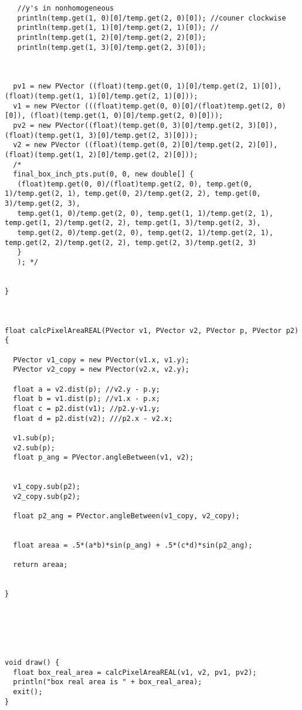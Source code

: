 \documentclass[11pt, twoside, reqno]{book}
\begin{document}
\begin{Verbatim}
   //y's in nonhomogeneous
   println(temp.get(1, 0)[0]/temp.get(2, 0)[0]); //couner clockwise 
   println(temp.get(1, 1)[0]/temp.get(2, 1)[0]); //
   println(temp.get(1, 2)[0]/temp.get(2, 2)[0]);
   println(temp.get(1, 3)[0]/temp.get(2, 3)[0]);
   
  

  pv1 = new PVector ((float)(temp.get(0, 1)[0]/temp.get(2, 1)[0]), (float)(temp.get(1, 1)[0]/temp.get(2, 1)[0]));
  v1 = new PVector (((float)temp.get(0, 0)[0]/(float)temp.get(2, 0)[0]), (float)(temp.get(1, 0)[0]/temp.get(2, 0)[0]));
  pv2 = new PVector((float)(temp.get(0, 3)[0]/temp.get(2, 3)[0]), (float)(temp.get(1, 3)[0]/temp.get(2, 3)[0]));
  v2 = new PVector ((float)(temp.get(0, 2)[0]/temp.get(2, 2)[0]), (float)(temp.get(1, 2)[0]/temp.get(2, 2)[0]));
  /*
  final_box_inch_pts.put(0, 0, new double[] { 
   (float)temp.get(0, 0)/(float)temp.get(2, 0), temp.get(0, 1)/temp.get(2, 1), temp.get(0, 2)/temp.get(2, 2), temp.get(0, 3)/temp.get(2, 3), 
   temp.get(1, 0)/temp.get(2, 0), temp.get(1, 1)/temp.get(2, 1), temp.get(1, 2)/temp.get(2, 2), temp.get(1, 3)/temp.get(2, 3), 
   temp.get(2, 0)/temp.get(2, 0), temp.get(2, 1)/temp.get(2, 1), temp.get(2, 2)/temp.get(2, 2), temp.get(2, 3)/temp.get(2, 3)
   }
   ); */


}



float calcPixelAreaREAL(PVector v1, PVector v2, PVector p, PVector p2) {

  PVector v1_copy = new PVector(v1.x, v1.y);
  PVector v2_copy = new PVector(v2.x, v2.y); 

  float a = v2.dist(p); //v2.y - p.y;
  float b = v1.dist(p); //v1.x - p.x;
  float c = p2.dist(v1); //p2.y-v1.y;
  float d = p2.dist(v2); ///p2.x - v2.x;

  v1.sub(p);
  v2.sub(p);
  float p_ang = PVector.angleBetween(v1, v2);
  

  v1_copy.sub(p2); 
  v2_copy.sub(p2);

  float p2_ang = PVector.angleBetween(v1_copy, v2_copy);


  float areaa = .5*(a*b)*sin(p_ang) + .5*(c*d)*sin(p2_ang);

  return areaa;


}






void draw() {
  float box_real_area = calcPixelAreaREAL(v1, v2, pv1, pv2);
  println("box real area is " + box_real_area);
  exit();
}


\end{Verbatim}
\end{document}
